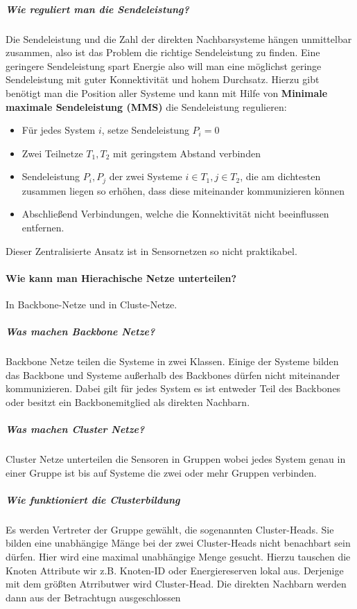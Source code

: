 	\subparagraph{Wie reguliert man die Sendeleistung?}
	Die Sendeleistung und die Zahl der direkten Nachbarsysteme hängen unmittelbar zusammen, also ist das Problem die richtige Sendeleistung zu finden. Eine geringere Sendeleistung spart Energie also will man eine möglichst geringe Sendeleistung mit guter Konnektivität und hohem Durchsatz. Hierzu gibt benötigt man die Position aller Systeme und kann mit Hilfe von \textbf{Minimale maximale Sendeleistung (MMS)} die Sendeleistung regulieren:
		\begin{itemize}
			\item Für jedes System $i$, setze Sendeleistung $P_i=0$
			\item Zwei Teilnetze $T_1, T_2$ mit geringstem Abstand verbinden
			\item Sendeleistung $P_i, P_j$ der zwei Systeme $i \in T_1, j \in T_2$, die am dichtesten zusammen liegen so erhöhen, dass diese miteinander kommunizieren können
			\item Abschließend Verbindungen, welche die Konnektivität nicht beeinflussen entfernen.
\end{itemize}	
Dieser Zentralisierte Ansatz ist in Sensornetzen so nicht praktikabel.

	\paragraph{Wie kann man Hierachische Netze unterteilen?}
	In Backbone-Netze und in Cluste-Netze.
	
	\subparagraph{Was machen Backbone Netze?}
	Backbone Netze teilen die Systeme in zwei Klassen. Einige der Systeme bilden das Backbone und Systeme außerhalb des Backbones dürfen nicht miteinander kommunizieren. Dabei gilt für jedes System es ist entweder Teil des Backbones oder besitzt ein Backbonemitglied als direkten Nachbarn.
	
	\subparagraph{Was machen Cluster Netze?}
		Cluster Netze unterteilen die Sensoren in Gruppen wobei jedes System genau in einer Gruppe ist bis auf Systeme die zwei oder mehr Gruppen verbinden.
		
	\subparagraph{Wie funktioniert die Clusterbildung}
	Es werden Vertreter der Gruppe gewählt, die sogenannten Cluster-Heads. Sie bilden eine unabhängige Mänge bei der zwei Cluster-Heads nicht benachbart sein dürfen. Hier wird eine maximal unabhängige Menge gesucht. Hierzu tauschen die Knoten Attribute wir z.B. Knoten-ID oder Energiereserven lokal aus.  Derjenige mit dem größten Atrributwer wird Cluster-Head. Die direkten Nachbarn werden dann aus der Betrachtugn ausgeschlossen 
	
